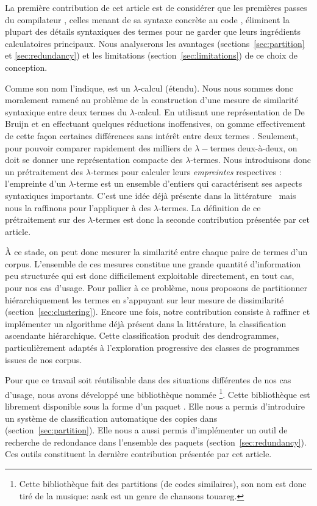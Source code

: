 La première contribution de cet article est de considérer que les
premières passes du compilateur {\OCaml}, celles menant de sa syntaxe
concrète au code {\LambdaCode}, éliminent la plupart des détails
syntaxiques des termes {\OCaml} pour ne garder que leurs ingrédients
calculatoires principaux. Nous analyserons les avantages
(sections~\ref{sec:partition} et \ref{sec:redundancy}) et les
limitations (section~\ref{sec:limitations}) de ce choix de conception.

Comme son nom l'indique, {\LambdaCode} est un $\lambda$-calcul
(étendu). Nous nous sommes donc moralement ramené au problème de la
construction d'une mesure de similarité syntaxique entre deux termes
du $\lambda$-calcul. En utilisant une représentation de De Bruijn et
en effectuant quelques réductions inoffensives, on gomme effectivement
de cette façon certaines différences sans intérêt entre deux termes
{\OCaml}. Seulement, pour pouvoir comparer rapidement des milliers de
$\lambda-$termes deux-à-deux, on doit se donner une représentation
compacte des $\lambda$-termes. Nous introduisons donc un prétraitement
des $\lambda$-termes pour calculer leurs \textit{empreintes}
respectives : l'empreinte d'un $\lambda$-terme est un ensemble
d'entiers qui caractérisent ses aspects syntaxiques importants. C'est
une idée déjà présente dans la
littérature~\cite{chilowicz:hal-00627811} mais nous la raffinons pour
l'appliquer à des $\lambda$-termes.  La définition de ce prétraitement
sur des $\lambda$-termes est donc la seconde contribution présentée
par cet article.

À ce stade, on peut donc mesurer la similarité entre chaque paire de
termes d'un corpus. L'ensemble de ces mesures constitue une grande
quantité d'information peu structurée qui est donc difficilement
exploitable directement, en tout cas, pour nos cas d'usage. Pour
pallier à ce problème, nous proposons de partitionner hiérarchiquement
les termes en s'appuyant sur leur mesure de dissimilarité
(section~\ref{sec:clustering}). Encore une fois, notre contribution
consiste à raffiner et implémenter un algorithme déjà présent dans la
littérature, la classification ascendante hiérarchique. Cette
classification produit des dendrogrammes, particulièrement adaptés à
l'exploration progressive des classes de programmes issues de nos
corpus.

Pour que ce travail soit réutilisable dans des situations différentes
de nos cas d'usage, nous avons développé une bibliothèque nommée
{\Asak}\footnote{Cette bibliothèque fait des partitions (de codes
similaires), son nom est donc tiré de la musique: asak est un genre de
chansons touareg.}.  Cette bibliothèque est librement disponible sous
la forme d'un paquet {\Opam}.  Elle nous a permis d'introduire un
système de classification automatique des copies dans
{\LearnOCaml}~\cite{learnocaml} (section~\ref{sec:partition}). Elle
nous a aussi permis d'implémenter un outil de recherche de redondance
dans l'ensemble des paquets {\Opam}
(section~\ref{sec:redundancy}). Ces outils constituent la dernière
contribution présentée par cet article.

